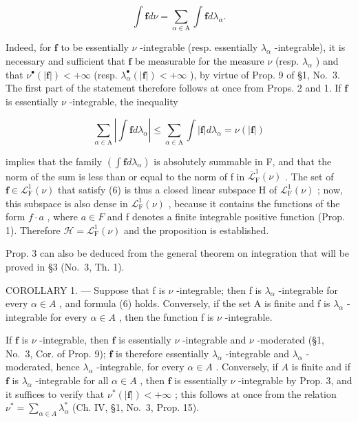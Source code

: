 \[
\int \mathbf {f} d \nu = \sum_ {\alpha \in \mathrm{A}} \int \mathbf {f} d \lambda_ {\alpha}.\tag{6}
\]

Indeed, for \(\mathbf{f}\) to be essentially \(\nu\) -integrable (resp. essentially \(\lambda_{\alpha}\) -integrable), it is necessary and sufficient that \(\mathbf{f}\) be measurable for the measure \(\nu\) (resp. \(\lambda_{\alpha}\) ) and that \(\nu^{\bullet}(|\mathbf{f}|) < +\infty\) (resp. \(\lambda_{\alpha}^{\bullet}(|\mathbf{f}|) < +\infty\) ), by virtue of Prop. 9 of §1, No.~3. The first part of the statement therefore follows at once from Props. 2 and 1. If \(\mathbf{f}\) is essentially \(\nu\) -integrable, the inequality

\[
\sum_ {\alpha \in \mathrm{A}} \left| \int \mathbf {f} d \lambda_ {\alpha} \right| \leqslant \sum_ {\alpha \in \mathrm{A}} \int | \mathbf {f} | d \lambda_ {\alpha} = \nu (| \mathbf {f} |)
\]

implies that the family \(\left(\int\mathbf{f}d\lambda_{\alpha}\right)\) is absolutely summable in F, and that the norm of the sum is less than or equal to the norm of f in \(\overline{\mathcal{L}}_{\mathrm{F}}^{1}(\nu)\) . The set of \(\mathbf{f}\in\mathcal{L}_{\mathrm{F}}^{1}(\nu)\) that satisfy (6) is thus a closed linear subspace H of \(\mathcal{L}_{\mathrm{F}}^{1}(\nu)\) ; now, this subspace is also dense in \(\mathcal{L}_{\mathrm{F}}^{1}(\nu)\) , because it contains the functions of the form \(f\cdot a\) , where \(a\in F\) and f denotes a finite integrable positive function (Prop. 1). Therefore \(\mathcal{H}=\mathcal{L}_{\mathrm{F}}^{1}(\nu)\) and the proposition is established.

Prop. 3 can also be deduced from the general theorem on integration that will be proved in §3 (No.~3, Th. 1).

COROLLARY 1. --- Suppose that f is \(\nu\) -integrable; then f is \(\lambda_{\alpha}\) -integrable for every \(\alpha \in A\) , and formula (6) holds. Conversely, if the set A is finite and f is \(\lambda_{\alpha}\) -integrable for every \(\alpha \in A\) , then the function f is \(\nu\) -integrable.

If \(\mathbf{f}\) is \(\nu\) -integrable, then \(\mathbf{f}\) is essentially \(\nu\) -integrable and \(\nu\) -moderated (§1, No.~3, Cor. of Prop. 9); \(\mathbf{f}\) is therefore essentially \(\lambda_{\alpha}\) -integrable and \(\lambda_{\alpha}\) -moderated, hence \(\lambda_{\alpha}\) -integrable, for every \(\alpha \in A\) . Conversely, if \(A\) is finite and if \(\mathbf{f}\) is \(\lambda_{\alpha}\) -integrable for all \(\alpha \in A\) , then \(\mathbf{f}\) is essentially \(\nu\) -integrable by Prop. 3, and it suffices to verify that \(\nu^{*}(|\mathbf{f}|) < +\infty\) ; this follows at once from the relation \(\nu^{*} = \sum_{\alpha \in A} \lambda_{\alpha}^{*}\) (Ch. IV, §1, No.~3, Prop. 15).

